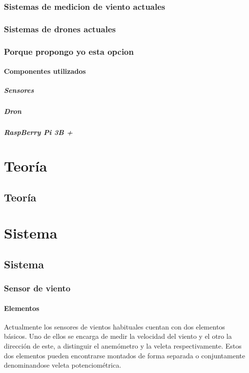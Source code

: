 \documentclass[spanish]{book}
\begin{document}
    \section{Sistemas de medicion de viento actuales}
    \section{Sistemas de drones actuales}
    \section{Porque propongo yo esta opcion}
        \subsection{Componentes utilizados}
        \subsubsection{Sensores}
        \subsubsection{Dron}
        \subsubsection{RaspBerry Pi 3B +}

\part{Teoría}
    \chapter{Teoría}

\part{Sistema}

    \chapter{Sistema}
        \section{Sensor de viento}
            \subsection{Elementos}
            Actualmente los sensores de vientos habituales cuentan con dos elementos básicos. Uno de ellos se encarga de medir la velocidad del viento y el otro la dirección de este, a distinguir el anemómetro y la veleta respectivamente. Estos dos elementos pueden encontrarse montados de forma separada o conjuntamente denominandose veleta potenciométrica. 
            
\end{document}
